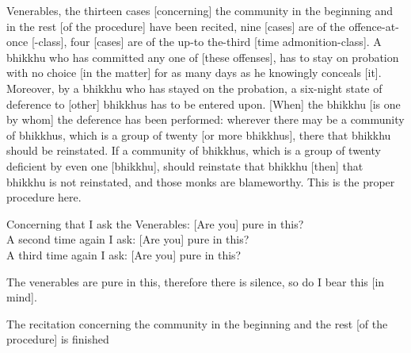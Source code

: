 \begin{center}
	Venerables, the thirteen cases [concerning] the community in the beginning and in the rest [of the procedure] have been recited, nine [cases] are of the offence-at-once [-class], four [cases] are of the up-to the-third [time admonition-class]. A bhikkhu who has committed any one of [these offenses], has to stay on probation with no choice [in the matter] for as many days as he knowingly conceals [it]. Moreover, by a bhikkhu who has stayed on the probation, a six-night state of deference to [other] bhikkhus has to be entered upon. [When] the bhikkhu [is one by whom] the deference has been performed: wherever there may be a community of bhikkhus, which is a group of twenty [or more bhikkhus], there that bhikkhu should be reinstated. If a community of bhikkhus, which is a group of twenty deficient by even one [bhikkhu], should reinstate that bhikkhu [then] that bhikkhu is not reinstated, and those monks are blameworthy. This is the proper procedure here.

	\smallskip

	Concerning that I ask the Venerables: [Are you] pure in this?\\
	A second time again I ask: [Are you] pure in this?\\
	A third time again I ask: [Are you] pure in this?

	\smallskip

	The venerables are pure in this, therefore there is silence, so do I bear this [in mind].
\end{center}

\begin{outro}
	The recitation concerning the community in the beginning and the rest [of the procedure] is finished
\end{outro}

\clearpage

